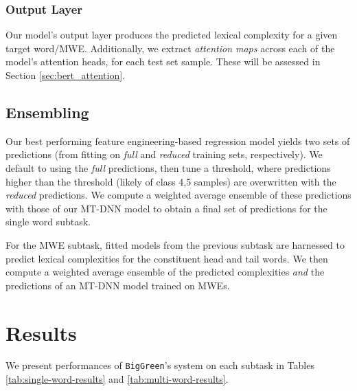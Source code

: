 \documentclass{dcthesis}
\theoremstyle{definition}
\theoremstyle{remark}
\begin{document}
\subsection{Output Layer}

Our model's output layer produces the predicted lexical complexity for a given target word/MWE. Additionally, we extract \textit{attention maps} across each of the model's attention heads, for each test set sample. These will be assessed in Section \ref{sec:bert_attention}.

\section{Ensembling}

Our best performing feature engineering-based regression model yields two sets of predictions (from fitting on \textit{full} and \textit{reduced} training sets, respectively). We default to using the \textit{full} predictions, then tune a threshold, where predictions higher than the threshold (likely of class 4,5 samples) are overwritten with the \textit{reduced} predictions. We compute a weighted average ensemble of these predictions with those of our MT-DNN model to obtain a final set of predictions for the single word subtask. 

For the MWE subtask, fitted models from the previous subtask are harnessed to predict lexical complexities for the constituent head and tail words. We then compute a weighted average ensemble of the predicted complexities \textit{and} the predictions of an MT-DNN model trained on MWEs.

\chapter{Results}

\vspace*{-\baselineskip}

We present performances of \texttt{BigGreen}'s system on each subtask in Tables \ref{tab:single-word-results} and \ref{tab:multi-word-results}.
\end{document}
